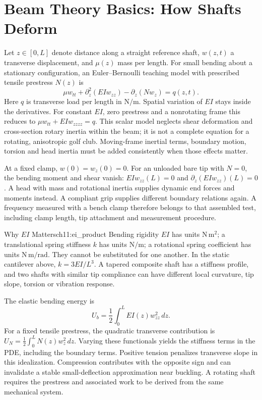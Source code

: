 \section{Beam Theory Basics: How Shafts Deform}
Let $z\in[0,L]$ denote distance along a straight reference shaft, $w(z,t)$ a transverse displacement, and $\mu(z)$ mass per length. For small bending about a stationary configuration, an Euler--Bernoulli teaching model with prescribed tensile prestress $N(z)$ is
\[
\mu w_{tt}+\partial_z^2(EI w_{zz})-\partial_z(Nw_z)=q(z,t).
\]
Here $q$ is transverse load per length in $\mathrm{N/m}$. Spatial variation of $EI$ stays inside the derivatives. For constant $EI$, zero prestress and a nonrotating frame this reduces to $\mu w_{tt}+EIw_{zzzz}=q$. This scalar model neglects shear deformation and cross-section rotary inertia within the beam; it is not a complete equation for a rotating, anisotropic golf club. Moving-frame inertial terms, boundary motion, torsion and head inertia must be added consistently when those effects matter.

At a fixed clamp, $w(0)=w_z(0)=0$. For an unloaded bare tip with $N=0$, the bending moment and shear vanish: $EIw_{zz}(L)=0$ and $\partial_z(EIw_{zz})(L)=0$. A head with mass and rotational inertia supplies dynamic end forces and moments instead. A compliant grip supplies different boundary relations again. A frequency measured with a bench clamp therefore belongs to that assembled test, including clamp length, tip attachment and measurement procedure.

\begin{laymansbox}{Why $EI$ Matters}{ch11:ei_product}
Bending rigidity $EI$ has units $\mathrm{N\,m^2}$; a translational spring stiffness $k$ has units $\mathrm{N/m}$; a rotational spring coefficient has units $\mathrm{N\,m/rad}$. They cannot be substituted for one another. In the static cantilever above, $k=3EI/L^3$. A tapered composite shaft has a stiffness profile, and two shafts with similar tip compliance can have different local curvature, tip slope, torsion or vibration response.
\end{laymansbox}

The elastic bending energy is
\[
U_b=\frac12\int_0^L EI(z)w_{zz}^2\,dz.
\]
For a fixed tensile prestress, the quadratic transverse contribution is $U_N=\tfrac12\int_0^L N(z)w_z^2\,dz$. Varying these functionals yields the stiffness terms in the PDE, including the boundary terms. Positive tension penalizes transverse slope in this idealization. Compression contributes with the opposite sign and can invalidate a stable small-deflection approximation near buckling. A rotating shaft requires the prestress and associated work to be derived from the same mechanical system.

